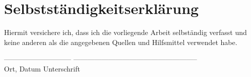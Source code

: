 \chapter*{Selbstst\"andigkeitserkl\"arung}

	
Hiermit  versichere  ich,  dass  ich  die  vorliegende  Arbeit  selbst\"andig  verfasst  und  keine  
anderen als die angegebenen Quellen und Hilfsmittel verwendet habe. 

\vspace{30mm}




----------------------------- \hspace{5mm} -----------------------------------------------------\\

\hspace{0mm} Ort, Datum \hspace{25mm} Unterschrift
